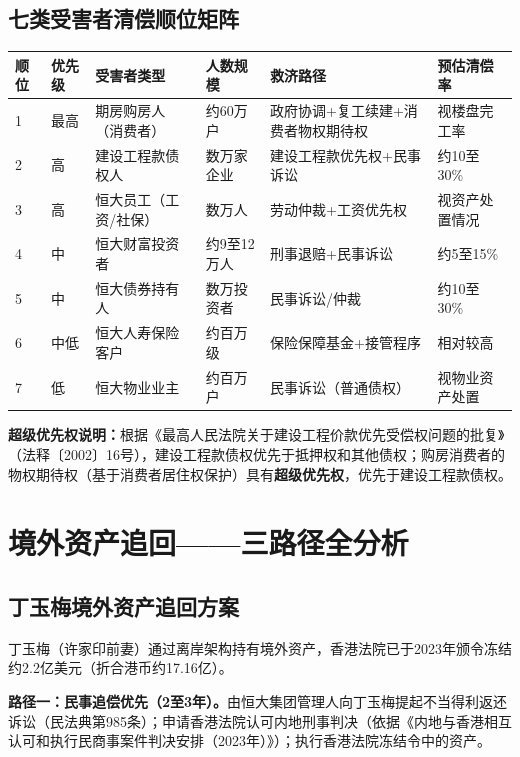 \documentclass[11pt,a4paper,oneside,openany]{article}
\begin{document}
\subsection{七类受害者清偿顺位矩阵}
\begin{threeparttable}
\caption{恒大案受害者清偿顺位矩阵（法律依据：刑事诉讼法解释第300条）}
\begin{tabular}{p{1.5cm}p{1.3cm}p{2.8cm}p{1.3cm}p{3cm}p{2cm}}
\toprule
\textbf{顺位} & \textbf{优先级} & \textbf{受害者类型} & \textbf{人数规模} & \textbf{救济路径} & \textbf{预估清偿率} \\
\midrule
1 & \cellcolor{rowalt}最高 & 期房购房人（消费者） & 约60万户 & 政府协调+复工续建+消费者物权期待权 & 视楼盘完工率 \\
2 & \cellcolor{rowalt}高 & 建设工程款债权人 & 数万家企业 & 建设工程款优先权+民事诉讼 & 约10至30\% \\
3 & 高 & 恒大员工（工资/社保） & 数万人 & 劳动仲裁+工资优先权 & 视资产处置情况 \\
4 & 中 & 恒大财富投资者 & 约9至12万人 & 刑事退赔+民事诉讼 & 约5至15\% \\
5 & 中 & 恒大债券持有人 & 数万投资者 & 民事诉讼/仲裁 & 约10至30\% \\
6 & 中低 & 恒大人寿保险客户 & 约百万级 & 保险保障基金+接管程序 & 相对较高 \\
7 & 低 & 恒大物业业主 & 约百万户 & 民事诉讼（普通债权） & 视物业资产处置 \\
\bottomrule
\end{tabular}
\end{threeparttable}

\textbf{超级优先权说明：}根据《最高人民法院关于建设工程价款优先受偿权问题的批复》（法释〔2002〕16号），建设工程款债权优先于抵押权和其他债权；购房消费者的物权期待权（基于消费者居住权保护）具有\textbf{超级优先权}，优先于建设工程款债权。

\section{境外资产追回——三路径全分析}
\subsection{丁玉梅境外资产追回方案}
丁玉梅（许家印前妻）通过离岸架构持有境外资产，香港法院已于2023年颁令冻结约2.2亿美元（折合港币约17.16亿）。

\textbf{路径一：民事追偿优先（2至3年）。}由恒大集团管理人向丁玉梅提起不当得利返还诉讼（民法典第985条）；申请香港法院认可内地刑事判决（依据《内地与香港相互认可和执行民商事案件判决安排（2023年）》）；执行香港法院冻结令中的资产。
\end{document}

